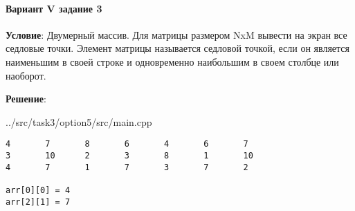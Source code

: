\paragraph{Вариант V задание 3} \hspace{0pt}

\textbf{Условие}:
Двумерный массив.
Для матрицы размером NxM вывести на экран все седловые точки. Элемент матрицы называется седловой точкой, если он является наименьшим в своей строке и одновременно наибольшим в своем столбце или наоборот.

\textbf{Решение}:


{../src/task3/option5/src/main.cpp}

\begin{lstlisting}[language=Out,]
4       7       8       6       4       6       7
3       10      2       3       8       1       10
4       7       1       7       3       7       2

arr[0][0] = 4
arr[2][1] = 7
\end{lstlisting}